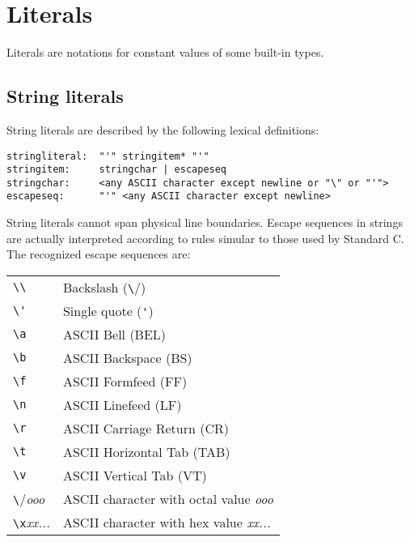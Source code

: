 \section{Literals}

Literals are notations for constant values of some built-in types.

\subsection{String literals}

String literals are described by the following lexical definitions:

\begin{verbatim}
stringliteral:  "'" stringitem* "'"
stringitem:     stringchar | escapeseq
stringchar:     <any ASCII character except newline or "\" or "'">
escapeseq:      "'" <any ASCII character except newline>
\end{verbatim}

String literals cannot span physical line boundaries.  Escape
sequences in strings are actually interpreted according to rules
simular to those used by Standard C.  The recognized escape sequences
are:

\begin{center}
\begin{tabular}{|l|l|}
\hline
\verb/\\/	& Backslash (\verb/\/) \\
\verb/\'/	& Single quote (\verb/'/) \\
\verb/\a/	& ASCII Bell (BEL) \\
\verb/\b/	& ASCII Backspace (BS) \\
\verb/\f/	& ASCII Formfeed (FF) \\
\verb/\n/	& ASCII Linefeed (LF) \\
\verb/\r/	& ASCII Carriage Return (CR) \\
\verb/\t/	& ASCII Horizontal Tab (TAB) \\
\verb/\v/	& ASCII Vertical Tab (VT) \\
\verb/\/{\em ooo}	& ASCII character with octal value {\em ooo} \\
\verb/\x/{\em xx...}	& ASCII character with hex value {\em xx...} \\
\hline
\end{tabular}
\end{center}

